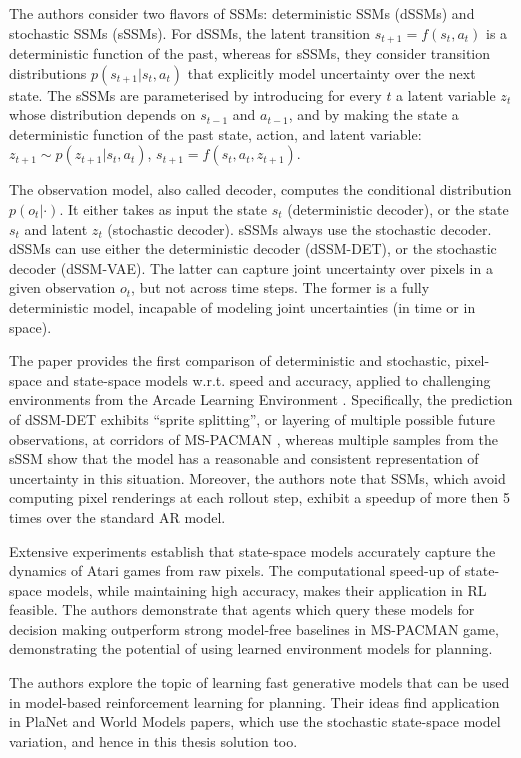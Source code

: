 The authors consider two flavors of SSMs: deterministic SSMs (dSSMs) and stochastic SSMs (sSSMs). For dSSMs, the latent transition $s_{t+1} = f(s_t, a_t)$ is a deterministic function of the past, whereas for sSSMs, they consider transition distributions $p(s_{t+1}|s_t, a_t)$ that explicitly model uncertainty over the next state. The sSSMs are parameterised by introducing for every $t$ a latent variable $z_t$ whose distribution depends on $s_{t−1}$ and $a_{t−1}$, and by making the state a deterministic function of the past state, action, and latent variable: $z_{t+1} \sim p(z_{t+1}|s_t, a_t)$, $s_{t+1} = f(s_t, a_t, z_{t+1})$.

The observation model, also called decoder, computes the conditional distribution $p(o_t|\cdot)$. It either takes as input the state $s_t$ (deterministic decoder), or the state $s_t$ and latent $z_t$ (stochastic decoder). sSSMs always use the stochastic decoder. dSSMs can use either the deterministic decoder (dSSM-DET), or the stochastic decoder (dSSM-VAE). The latter can capture joint uncertainty over pixels in a given observation $o_t$, but not across time steps. The former is a fully deterministic model, incapable of modeling joint uncertainties (in time or in space).

The paper provides the first comparison of deterministic and stochastic, pixel-space and state-space models w.r.t. speed and accuracy, applied to challenging environments from the Arcade Learning Environment \cite{Code.ALE}. Specifically, the prediction of dSSM-DET exhibits “sprite splitting”, or layering of multiple possible future observations, at corridors of MS-PACMAN \cite{Game.MSPACMAN}, whereas multiple samples from the sSSM show that the model has a reasonable and consistent representation of uncertainty in this situation. Moreover, the authors note that SSMs, which avoid computing pixel renderings at each rollout step, exhibit a speedup of more then 5 times over the standard AR model.

Extensive experiments establish that state-space models accurately capture the dynamics of Atari games from raw pixels. The computational speed-up of state-space models, while maintaining high accuracy, makes their application in RL feasible. The authors demonstrate that agents which query these models for decision making outperform strong model-free baselines in MS-PACMAN game, demonstrating the potential of using learned environment models for planning.

The authors explore the topic of learning fast generative models that can be used in model-based reinforcement learning for planning. Their ideas find application in PlaNet \cite{Algo.PlaNet} and World Models \cite{Algo.WorldModels} papers, which use the stochastic state-space model variation, and hence in this thesis solution too.

